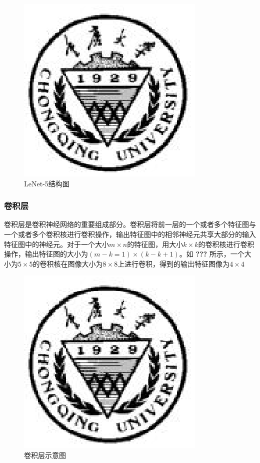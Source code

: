 \documentclass[bachelor,zhspacing]{cqu}  %
\begin{document}
\begin{figure}[htbp]
\centering
\includegraphics{./pic/cqu.eps}
\caption{LeNet-5结构图}\label{fig:cnn-topol-lenet}
\end{figure}

\subsubsection{卷积层}\label{ux5377ux79efux5c42}

卷积层是卷积神经网络的重要组成部分。卷积层将前一层的一个或者多个特征图与一个或者多个卷积核进行卷积操作，输出特征图中的相邻神经元共享大部分的输入特征图中的神经元。对于一个大小\(m\times n\)的特征图，用大小\(k\times k\)的卷积核进行卷积操作，输出特征图的大小为\((m-k=1)\times (k-k+1)\)。如
\textbf{???}
所示，一个大小为\(5\times 5\)的卷积核在图像大小为\(8\times 8\)上进行卷积，得到的输出特征图像为\(4 \times 4\)

\begin{figure}[htbp]
\centering
\includegraphics{./pic/cqu.eps}
\caption{卷积层示意图}\label{fig:cnn-topol-c}
\end{figure}
\end{document}
